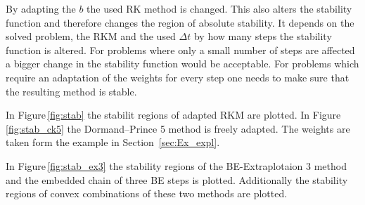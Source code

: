 \documentclass[a4paper]{article}
\numberwithin{equation}{section}
\theoremstyle{plain}
\theoremstyle{definition}
\numberwithin{theorem}{section}
\newcommand{\dt}{{\Delta t}}
\newcommand{\1}{\mathbbm{1}}
\begin{document}
By adapting the $b$ the used RK method is changed. This also alters the stability function and therefore changes the region of absolute stability.
It depends on the solved problem, the RKM and the used $\dt$ by how many steps the stability function is altered. For problems where only a small number of steps are affected a bigger change in the stability function would be acceptable. For problems which require an adaptation of the weights for every step one needs to make sure that the resulting method is stable.

In Figure\,\ref{fig:stab} the stabilit regions of adapted RKM are plotted. 
In Figure\,\ref{fig:stab_ck5} the Dormand--Prince 5 method is freely adapted.
The weights are taken form the example in Section~\ref{sec:Ex_expl}.

In Figure\,\ref{fig:stab_ex3} the stability regions of the BE-Extraplotaion 3 method and the embedded chain of three BE steps is plotted. Additionally the stability regions of convex combinations of these two methods are plotted.
\end{document}
